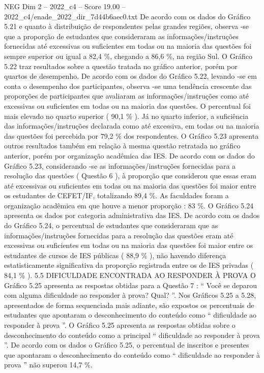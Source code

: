 \begin{textsample}{NEG Dim 2 – 2022\_c4 – Score 19.00 – 2022\_c4/enade\_2022\_dir\_7d44b6aec0.txt}
De acordo com os dados do Gráfico 5.21 e quanto à distribuição de respondentes pelas grandes regiões, observa -se que a proporção de estudantes que consideraram as informações/instruções fornecidas até excessivas ou suficientes em todas ou na maioria das questões foi sempre superior ou igual a 82,4 \%, chegando a 86,6 \%, na região Sul.
O Gráfico 5.22 traz resultados sobre a questão tratada no gráfico anterior, porém por quartos de desempenho.
De acordo com os dados do Gráfico 5.22, levando -se em conta o desempenho dos participantes, observa -se uma tendência crescente das proporções de participantes que avaliaram as informações/instruções como até excessivas ou suficientes em todas ou na maioria das questões.
O percentual foi mais elevado no quarto superior ( 90,1 \% ).
Já no quarto inferior, a suficiência das informações/instruções declarada como até excessiva, em todas ou na maioria das questões foi percebida por 79,2 \% dos respondentes.
O Gráfico 5.23 apresenta outros resultados também em relação à mesma questão retratada no gráfico anterior, porém por organização acadêmica das IES.
De acordo com os dados do Gráfico 5.23, considerando -se as informações/instruções fornecidas para a resolução das questões ( Questão 6 ), à proporção que considerou que essas eram até excessivas ou suficientes em todas ou na maioria das questões foi maior entre os estudantes de CEFET/IF, totalizando 89,4 \%.
As faculdades foram a organização acadêmica em que houve a menor proporção : 83 \%.
O Gráfico 5.24 apresenta os dados por categoria administrativa das IES.
De acordo com os dados do Gráfico 5.24, o percentual de estudantes que consideraram que as informações/instruções fornecidas para a resolução das questões eram até excessivas ou suficientes em todas ou na maioria das questões foi maior entre os estudantes de cursos de IES públicas ( 88,9 \% ), não havendo diferença estatisticamente significativa da proporção registrada entre os de IES privadas ( 84,1 \% ). 5.5 DIFICULDADE ENCONTRADA AO RESPONDER À PROVA O Gráfico 5.25 apresenta as respostas obtidas para a Questão 7 : “ Você se deparou com alguma dificuldade ao responder à prova?
Qual? ”.
Nos Gráficos 5.25 a 5.28, apresentados de forma sequenciada mais adiante, são expostos os percentuais de estudantes que apontaram o desconhecimento do conteúdo como “ dificuldade ao responder à prova ”.
O Gráfico 5.25 apresenta as respostas obtidas sobre o desconhecimento do conteúdo como a principal “ dificuldade ao responder à prova ”.
De acordo com os dados o Gráfico 5.25, o percentual de inscritos e presentes que apontaram o desconhecimento do conteúdo como “ dificuldade ao responder à prova ” não superou 14,7 \%.

\end{textsample}

